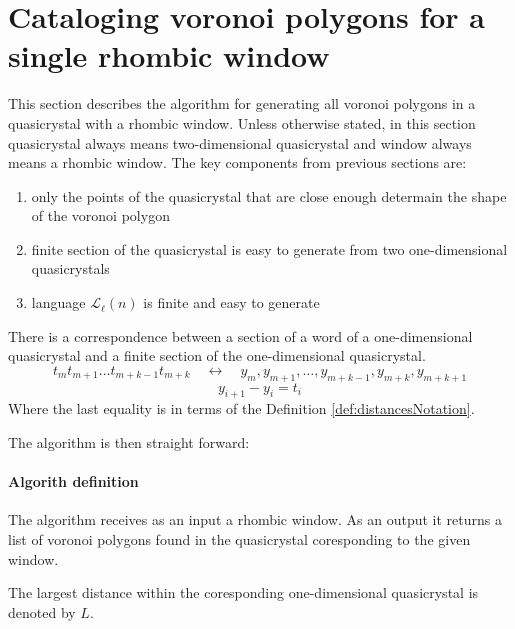 \documentclass[text.tex]{subfiles}
\begin{document}
\section{Cataloging voronoi polygons for a single rhombic window}
This section describes the algorithm for generating all voronoi polygons in a quasicrystal with a rhombic window. Unless otherwise stated, in this section quasicrystal always means two-dimensional quasicrystal and window always means a rhombic window. The key components from previous sections are:

\begin{enumerate}
\item only the points of the quasicrystal that are close enough determain the shape of the voronoi polygon
\item finite section of the quasicrystal is easy to generate from two one-dimensional quasicrystals
\item language $\mathcal{L}_{\ell}(n)$ is finite and easy to generate
\end{enumerate}

There is a correspondence between a section of a word of a one-dimensional quasicrystal and a finite section of the one-dimensional quasicrystal. 
$$t_m t_{m+1}\dots t_{m+k-1} t_{m+k}\quad\longleftrightarrow\quad y_m, y_{m+1},\dots ,y_{m+k-1},y_{m+k},y_{m+k+1}$$
$$y_{i+1}-y_{i} = t_{i}$$
Where the last equality is in terms of the Definition \ref{def:distancesNotation}.

The algorithm is then straight forward:

\paragraph{Algorith definition} The algorithm receives as an input a rhombic window. As an output it returns a list of voronoi polygons found in the quasicrystal coresponding to the given window.

The largest distance within the coresponding one-dimensional quasicrystal is denoted by $L$. 
\end{document}
